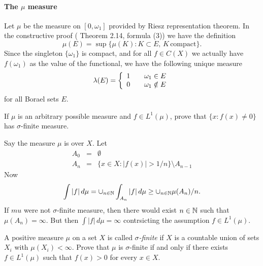 \begin{enumerate}
\paragraph{The \(\mu\) measure}
Let \(\mu\) be the measure on \([0,\omega_1]\) provided by
Riesz representation theorem. In the constructive proof
(\cite{RudinRCA80} Theorem 2.14, formula (3)) we have the definition
\begin{equation*}
 \mu(E) = \sup\{\mu(K): K\subset E,\, K\, \textrm{compact}\}.
\end{equation*}
Since the singleton \(\{\omega_1\}\) is compact, and for all \(f\in C(X)\)
we actually have \(f(\omega_1)\) as the value of the functional,
we have the following unique measure
\begin{equation*}
 \lambda(E) = \left\{\begin{array}{l@{\qquad}l}
                      1 & \omega_1 \in E \\
                      0 & \omega_1 \notin E
                     \end{array}\right.
\end{equation*}
for all Borael sets $E$.

\begin{excopy}
If \label{ex:2:19}
\(\mu\) is an arbitrary possible measure and \(f\in L^1(\mu)\),
prove that  \(\{x: f(x)\neq 0\}\) has \(\sigma\)-finite measure.
\end{excopy}

Say the measure \(\mu\) is over $X$. Let
\begin{eqnarray*}
A_0 &=& \emptyset  \\
A_n &=& \{x\in X: |f(x)| > 1/n\} \setminus A_{n-1}
\end{eqnarray*}
Now
\begin{equation*}
\int |f|\,d\mu
 =    \cup_{n\in\mathbb{N}} \int_{A_n} |f|\,d\mu
 \geq \cup_{n\in\mathbb{N}} \mu(A_n)/n.
\end{equation*}
If \(mu\) were not \(\sigma\)-finite measure, then there would exist
\(n\in\mathbb{N}\) such that \(\mu(A_n)=\infty\).
But then \(\int |f|\,d\mu = \infty\) contrsicting the
assumption \(f\in L^1(\mu)\).


\begin{excopy}
A positive measure \(\mu\) on a set $X$ is called
\emph{\(\sigma\)-finite} if $X$ is a countable union of sets \(X_i\)
with \(\mu(X_i) < \infty\). Prove that \(\mu\) is \(\sigma\)-finite
if and only if there exists  \(f\in L^1(\mu)\)
such that \(f(x)>0\) for every \(x\in X\).
\end{excopy}


\end{enumerate}
